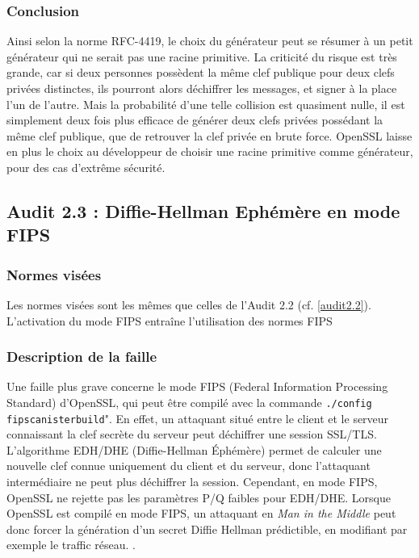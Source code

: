 		\subsubsection{Conclusion}

		Ainsi selon la norme RFC-4419, le choix du générateur peut se résumer à un petit générateur qui ne serait pas une racine primitive. La criticité du risque est très grande, car si deux personnes possèdent la même clef publique pour deux clefs privées distinctes, ils pourront alors déchiffrer les messages, et signer à la place l'un de l'autre. Mais la probabilité d'une telle collision est quasiment nulle, il est simplement deux fois plus efficace de générer deux clefs privées possédant la même clef publique, que de retrouver la clef privée en brute force.
		OpenSSL laisse en plus le choix au développeur de choisir une racine primitive comme générateur, pour des cas d'extrême sécurité.
		
	\subsection{Audit 2.3 : Diffie-Hellman Ephémère en mode FIPS}
		\subsubsection{Normes visées}

		Les normes visées sont les mêmes que celles de l'Audit 2.2 (cf. \ref{audit2.2}).\\
		L'activation du mode FIPS entraîne l'utilisation des normes FIPS \cite{fips186-4} \cite{fips140-2}

		\subsubsection{Description de la faille}
	
		Une faille plus grave concerne le mode FIPS (Federal Information Processing Standard) d'OpenSSL, qui peut être compilé avec la commande \texttt{./config fipscanisterbuild}". En effet, un attaquant situé entre le client et le serveur connaissant la clef secrète du serveur peut déchiffrer une session SSL/TLS. \\
	
		L'algorithme EDH/DHE (Diffie-Hellman Éphémère) permet de calculer une nouvelle clef connue uniquement du client et du serveur, donc l'attaquant intermédiaire ne peut plus déchiffrer la session. Cependant, en mode FIPS, OpenSSL ne rejette pas les paramètres P/Q faibles pour EDH/DHE. Lorsque OpenSSL est compilé en mode FIPS, un attaquant en \textit{Man in the Middle} peut donc forcer la génération d'un secret Diffie Hellman prédictible, en modifiant par exemple le traffic réseau. \cite{vigilance-vul-10585} \cite{CVE-2011-5095}.

